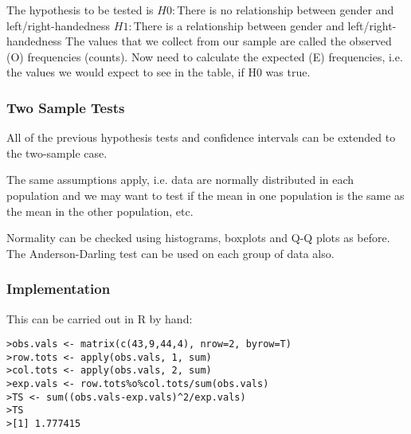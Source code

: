The hypothesis to be tested is
$H0 :$There is no relationship between gender and left/right-handedness
$H1 :$There is a relationship between gender and left/right-handedness
 The values that we collect from our sample are called the observed
(O) frequencies (counts). Now need to calculate the expected (E)
frequencies, i.e. the values we would expect to see in the table, if
H0 was true.






\subsubsection{Two Sample Tests}


All of the previous hypothesis tests and confidence intervals can be
extended to the two-sample case.

The same assumptions apply, i.e. data are normally distributed in
each population and we may want to test if the mean in one
population is the same as the mean in the other population, etc.

Normality can be checked using histograms, boxplots and Q-Q
plots as before. The Anderson-Darling test can be used on
each group of data also.


\subsubsection{Implementation}

This can be carried out in R by hand:

\footnotesize \begin{verbatim}
>obs.vals <- matrix(c(43,9,44,4), nrow=2, byrow=T)
>row.tots <- apply(obs.vals, 1, sum)
>col.tots <- apply(obs.vals, 2, sum)
>exp.vals <- row.tots%o%col.tots/sum(obs.vals)
>TS <- sum((obs.vals-exp.vals)^2/exp.vals)
>TS
>[1] 1.777415
 \end{verbatim}\normalsize


